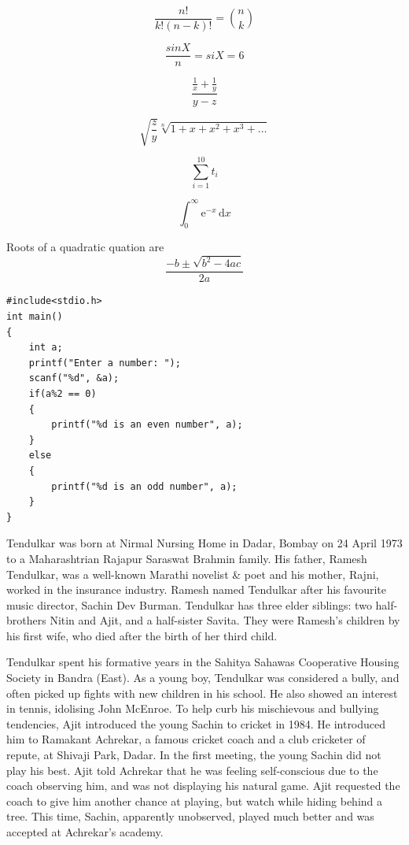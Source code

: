 \documentclass{report}
\begin{document}
\begin{equation}
	\frac{n!}{k!(n-k)!} = \binom{n}{k} 
\end{equation}

\begin{equation}
	\frac{sinX}{n} = siX = 6
\end{equation}

\begin{equation}
	\frac{\frac{1}{x}+\frac{1}{y}}{y-z}
\end{equation}

\begin{equation}
	\sqrt{\frac{z}{y}}
	\sqrt[n]{1+x+x^2+x^3+\ldots}
\end{equation}

\begin{equation}
	\sum_{i=1}^{10} t_i
\end{equation}

\begin{equation}
	\int_0^\infty \mathrm{e}^{-x}\,\mathrm{d}x
\end{equation}

Roots of a quadratic quation are
\begin{equation}
	\frac{-b \pm \sqrt{b^2-4ac}}{2a}
\end{equation}
	
\begin{lstlisting}[caption={Program to check odd or even}]
#include<stdio.h>
int main()
{
	int a;
	printf("Enter a number: ");
	scanf("%d", &a);
	if(a%2 == 0)
	{
		printf("%d is an even number", a);
	}
	else
	{
		printf("%d is an odd number", a);
	}
}
\end{lstlisting}


Tendulkar was born at Nirmal Nursing Home in Dadar, Bombay on 24 April 1973 to a Maharashtrian Rajapur Saraswat Brahmin family. His father, Ramesh Tendulkar, was a well-known Marathi novelist \& poet and his mother, Rajni, worked in the insurance industry. Ramesh named Tendulkar after his favourite music director, Sachin Dev Burman. Tendulkar has three elder siblings: two half-brothers Nitin and Ajit, and a half-sister Savita. They were Ramesh's children by his first wife, who died after the birth of her third child.

Tendulkar spent his formative years in the Sahitya Sahawas Cooperative Housing Society in Bandra (East). As a young boy, Tendulkar was considered a bully, and often picked up fights with new children in his school. He also showed an interest in tennis, idolising John McEnroe. To help curb his mischievous and bullying tendencies, Ajit introduced the young Sachin to cricket in 1984. He introduced him to Ramakant Achrekar, a famous cricket coach and a club cricketer of repute, at Shivaji Park, Dadar. In the first meeting, the young Sachin did not play his best. Ajit told Achrekar that he was feeling self-conscious due to the coach observing him, and was not displaying his natural game. Ajit requested the coach to give him another chance at playing, but watch while hiding behind a tree. This time, Sachin, apparently unobserved, played much better and was accepted at Achrekar's academy.
\end{document}
